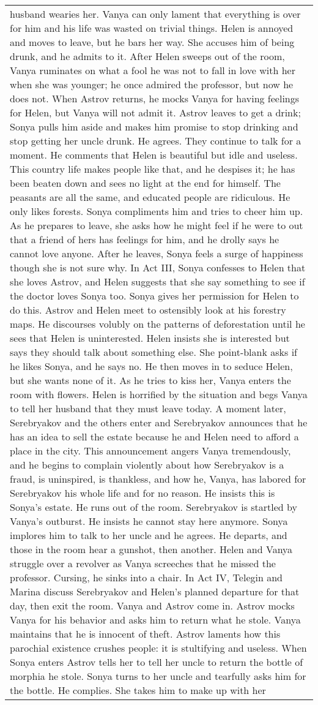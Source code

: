 \begin{table}[!htbp]
\begin{tabular}{p{\linewidth}}
husband wearies her. Vanya can only lament that everything is over for him and his life was wasted on trivial things. Helen is annoyed and moves to leave, but he bars her way. She accuses him of being drunk, and he admits to it. After Helen sweeps out of the room, Vanya ruminates on what a fool he was not to fall in love with her when she was younger; he once admired the professor, but now he does not. When Astrov returns, he mocks Vanya for having feelings for Helen, but Vanya will not admit it. Astrov leaves to get a drink; Sonya pulls him aside and makes him promise to stop drinking and stop getting her uncle drunk. He agrees. They continue to talk for a moment. He comments that Helen is beautiful but idle and useless. This country life makes people like that, and he despises it; he has been beaten down and sees no light at the end for himself. The peasants are all the same, and educated people are ridiculous. He only likes forests. Sonya compliments him and tries to cheer him up. As he prepares to leave, she asks how he might feel if he were to out that a friend of hers has feelings for him, and he drolly says he cannot love anyone. After he leaves, Sonya feels a surge of happiness though she is not sure why. In Act III, Sonya confesses to Helen that she loves Astrov, and Helen suggests that she say something to see if the doctor loves Sonya too. Sonya gives her permission for Helen to do this. Astrov and Helen meet to ostensibly look at his forestry maps. He discourses volubly on the patterns of deforestation until he sees that Helen is uninterested. Helen insists she is interested but says they should talk about something else. She point-blank asks if he likes Sonya, and he says no. He then moves in to seduce Helen, but she wants none of it. As he tries to kiss her, Vanya enters the room with flowers. Helen is horrified by the situation and begs Vanya to tell her husband that they must leave today. A moment later, Serebryakov and the others enter and Serebryakov announces that he has an idea to sell the estate because he and Helen need to afford a place in the city. This announcement angers Vanya tremendously, and he begins to complain violently about how Serebryakov is a fraud, is uninspired, is thankless, and how he, Vanya, has labored for Serebryakov his whole life and for no reason. He insists this is Sonya's estate. He runs out of the room. Serebryakov is startled by Vanya's outburst. He insists he cannot stay here anymore. Sonya implores him to talk to her uncle and he agrees. He departs, and those in the room hear a gunshot, then another. Helen and Vanya struggle over a revolver as Vanya screeches that he missed the professor. Cursing, he sinks into a chair. In Act IV, Telegin and Marina discuss Serebryakov and Helen's planned departure for that day, then exit the room. Vanya and Astrov come in. Astrov mocks Vanya for his behavior and asks him to return what he stole. Vanya maintains that he is innocent of theft. Astrov laments how this parochial existence crushes people: it is stultifying and useless. When Sonya enters Astrov tells her to tell her uncle to return the bottle of morphia he stole. Sonya turns to her uncle and tearfully asks him for the bottle. He complies. She takes him to make up with her 
\end{tabular}
\end{table}
